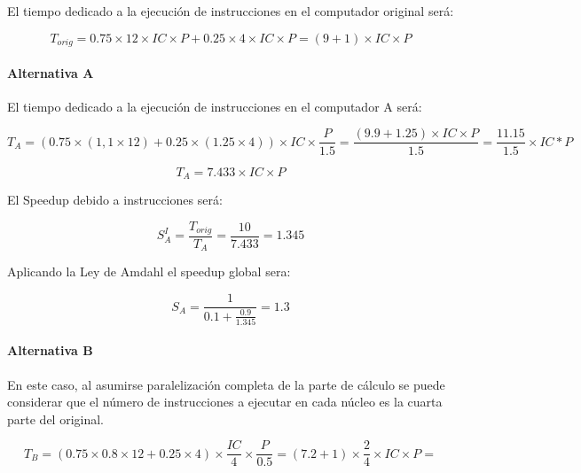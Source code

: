 \begin{acsolution}
\end{acsolution}

El tiempo dedicado a la ejecución de instrucciones en el computador original será:

\begin{equation}
T_{orig} = 
0.75 \times 12 \times IC \times P + 0.25 \times 4 \times IC \times P = 
(9+1) \times IC \times P
\end{equation}

\paragraph{Alternativa A}

El tiempo dedicado a la ejecución de instrucciones en el computador A será:

\begin{equation}
T_{A} =
(0.75 \times (1,1 \times 12) + 0.25 \times (1.25 \times 4)) \times IC \times \frac{P}{1.5} = 
\frac{(9.9 + 1.25) \times IC  \times P}{1.5} = 
\frac{11.15}{1.5} \times IC * P 
\end{equation}

\begin{equation}
T_{A} = 7.433 \times IC \times P
\end{equation}

El Speedup debido a instrucciones será:

\begin{equation}
S_{A}^{I} = 
\frac{T_{orig}}{T_{A}} = 
\frac{10}{7.433} = 
1.345
\end{equation}

Aplicando la Ley de Amdahl el speedup global sera:

\begin{equation}
S_{A} = \frac{1}{0.1 + \frac{0.9}{1.345}} = 1.3
\end{equation}

\paragraph{Alternativa B}

En este caso, al asumirse paralelización completa de la parte de cálculo se
puede considerar que el número de instrucciones a ejecutar en cada núcleo es la
cuarta parte del original.

\begin{equation}
T_{B} = 
(0.75 \times 0.8 \times 12 + 0.25 \times 4) \times \frac{IC}{4} \times \frac{P}{0.5} = 
( 7.2 + 1) \times \frac{2}{4} \times IC \times P = 
\end{equation}

